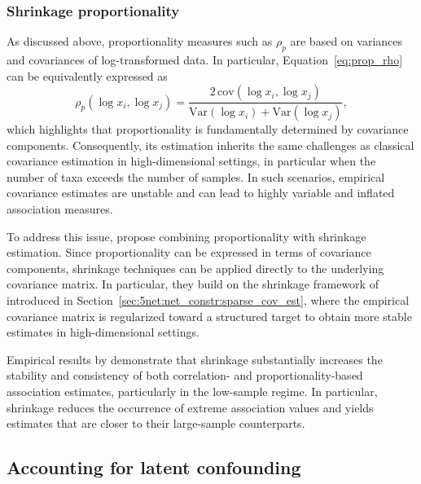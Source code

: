 \subsubsection{Shrinkage proportionality}
\label{sec:5net:net_constr:prop_shrink}

As discussed above, proportionality measures such as $\rho_p$ are based on variances and covariances of log-transformed data. In particular, Equation~\eqref{eq:prop_rho} can be equivalently expressed as
\begin{equation}
\rho_p(\log x_i, \log x_j) = \frac{2\,\mathrm{cov}(\log x_i, \log x_j)}{\mathrm{Var}(\log x_i) + \mathrm{Var}(\log x_j)},
\end{equation}
which highlights that proportionality is fundamentally determined by covariance components. Consequently, its estimation inherits the same challenges as classical covariance estimation in high-dimensional settings, in particular when the number of taxa exceeds the number of samples. In such scenarios, empirical covariance estimates are unstable and can lead to highly variable and inflated association measures.

To address this issue, \citet{badri2020shrinkage} propose combining proportionality with shrinkage estimation. Since proportionality can be expressed in terms of covariance components, shrinkage techniques can be applied directly to the underlying covariance matrix. In particular, they build on the shrinkage framework of \citet{schafer2005shrinkage} introduced in Section~\ref{sec:5net:net_constr:sparse_cov_est}, where the empirical covariance matrix is regularized toward a structured target to obtain more stable estimates in high-dimensional settings.

Empirical results by \citet{badri2020shrinkage} demonstrate that shrinkage substantially increases the stability and consistency of both correlation- and proportionality-based association estimates, particularly in the low-sample regime. In particular, shrinkage reduces the occurrence of extreme association values and yields estimates that are closer to their large-sample counterparts.

\subsection{Accounting for latent confounding}
\label{sec:5net:net_constr:latent_var}

